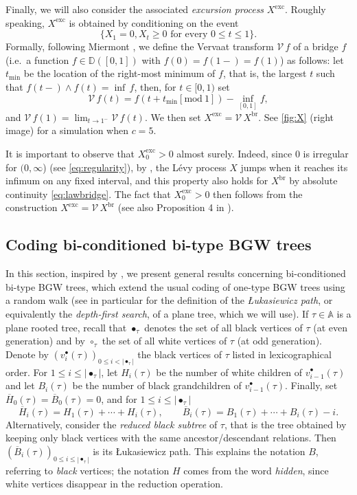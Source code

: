 \documentclass[10pt]{amsart}
\theoremstyle{definition}\newtheorem{defi}[theo]{Definition}\newtheorem{rema}[theo]{Remark}\newtheorem{exam}[theo]{Example}\newtheorem{exem}[theo]{Example}\newtheorem{nota}[theo]{Notation}
\providecommand{\abs}[1]{\lvert#1\rvert}
\newcommand{\D}{\mathbb{D}}
\def\oB{\overline{B}}
\def\oH{\overline{H}}
\def \Xexc{X^{\mathrm{exc}}}
\def \Xbr{X^{\mathrm{br}}}
\begin{document}
 Finally, we will also consider the associated \emph{excursion process} $\Xexc$.
Roughly speaking, $\Xexc$   is obtained by conditioning on the event
\[\{X_{1}=0, X_{t} \geq 0 \textrm{ for every } 0 \leq t \leq 1\}.\]
Formally, following Miermont \cite[Definition~1]{Mie01}, we define the Vervaat transform $\mathcal V\, f$ of a bridge $f$
(i.e.\ a function $f \in \D([0,1])$ with $f(0)=f(1-)=f(1)$) as follows:
let $t_{\min}$ be the location of the right-most minimum of $f$, that is, the largest $t$ such
that $f(t-) \wedge f (t) = \inf\, f$, then, for $t \in [0,1)$ set
\[\mathcal V\, f (t) =f(t + t_{\min} [\mathrm{mod}\ 1]) - \inf_{[0,1]} f, \]
and $\mathcal V\, f (1) = \lim_{t \to 1^-} \mathcal V\, f (t)$.
We then set $\Xexc= \mathcal V\, \Xbr$.
See \cref{fig:X} (right image) for a simulation  when $c=5$.

It is important to observe that $\Xexc_{0}>0$ almost surely. Indeed, since $0$ is irregular for $(0,\infty$) (see \eqref{eq:regularity}), by \cite[Theorem 3.1 (b)]{Mil77}, the L\'evy process $X$ jumps when it reaches its infimum on any fixed interval, and this property also holds for $\Xbr$ by absolute continuity \eqref{eq:lawbridge}.  The fact that $\Xexc_{0}>0$ then follows from the construction $\Xexc= \mathcal V\, \Xbr$ (see also Proposition 4 in \cite{Mie01}).





\subsection{Coding bi-conditioned bi-type BGW trees}
\label{ss:coding}


In this section, inspired by \cite{CL16}, we present general results concerning  bi-conditioned bi-type BGW trees, which extend the usual coding of one-type BGW trees using a random walk (see in particular \cite[Sec.~1.1]{LG05} for the definition of the  \emph{{\L}ukasiewicz path}, or equivalently the \emph{depth-first search}, of a plane tree, which we will use).  If $\tau \in \mathbb{A}$ is a plane rooted  tree,  recall that $\bullet_{\tau}$ denotes the set  of all black vertices of $\tau$ (at even generation) and by  $\circ_{\tau}$ the set of all white vertices of $\tau$ (at odd generation). Denote by $(v^{\bullet}_{i}(\tau))_{0 \leq i < \abs{\bullet_{\tau}}} $ the black vertices of $\tau$ listed in lexicographical order.  For $1 \leq i \leq \abs{\bullet_{\tau}}$, let $H_{i}(\tau)$ be the number of white children of $v^{\bullet}_{i-1}(\tau)$ and let $B_{i}(\tau)$ be the number of black grandchildren of $v^{\bullet}_{i-1}(\tau)$. Finally,  set $\oH_{0}(\tau)=\oB_{0}(\tau)=0$, and for $1 \leq i \leq \abs{\bullet_{\tau}}$
\[\oH_{i}(\tau)=H_{1}(\tau)+ \cdots+H_{i}(\tau), \qquad  \oB_{i}(\tau)=B_{1}(\tau)+ \cdots+B_{i}(\tau)-i.\]
Alternatively, consider the \emph{reduced black subtree} of $\tau$, that is the tree obtained by keeping only black vertices
with the same ancestor/descendant relations.
Then $(\overline{B}_i(\tau))_{0 \le i \le |\bullet_\tau|}$ is its {\L}ukasiewicz path.
This explains the notation $B$, referring to {\em black} vertices;
the notation $H$ comes from the word \emph{hidden},
since white vertices disappear in the reduction operation.
\end{document}
